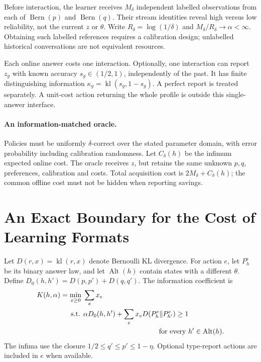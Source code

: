 \documentclass[sigconf,anonymous,review]{acmart}
\newcommand{\kl}{\operatorname{kl}}
\begin{document}
Before interaction, the learner receives $M_\delta$ independent labelled observations from each of $\operatorname{Bern}(p)$ and $\operatorname{Bern}(q)$. Their stream identities reveal high versus low reliability, not the current $z$ or $\theta$. Write $R_\delta=\log(1/\delta)$ and $M_\delta/R_\delta\to\alpha<\infty$. Obtaining such labelled references requires a calibration design; unlabelled historical conversations are not equivalent resources.

Each online answer costs one interaction. Optionally, one interaction can report $z_g$ with known accuracy $s_g\in(1/2,1)$, independently of the past. It has finite distinguishing information $\kappa_g=\kl(s_g,1-s_g)$. A perfect report is treated separately. A unit-cost action returning the whole profile is outside this single-answer interface.

\paragraph{An information-matched oracle.}
Policies must be uniformly $\delta$-correct over the stated parameter domain, with error probability including calibration randomness. Let $C_\delta(h)$ be the infimum expected online cost. The oracle receives $z$, but retains the same unknown $p,q$, preferences, calibration and costs. Total acquisition cost is $2M_\delta+C_\delta(h)$; the common offline cost must not be hidden when reporting savings.

\section{An Exact Boundary for the Cost of Learning Formats}
Let $D(r,x)=\kl(r,x)$ denote Bernoulli KL divergence. For action $e$, let $P_h^e$ be its binary answer law, and let $\operatorname{Alt}(h)$ contain states with a different $\theta$. Define $D_0(h,h')=D(p,p')+D(q,q')$. The information coefficient is
\begin{equation}\label{eq:program}
\begin{split}
 K(h,\alpha)=\min_{x\ge0}\;&\sum_e x_e\\
 \text{s.t. }&\alpha D_0(h,h')+\sum_e x_eD(P_h^e\Vert P_{h'}^e)\ge1\\
 &\hspace{38mm}\text{for every }h'\in\operatorname{Alt}(h).
\end{split}
\end{equation}
The infima use the closure $1/2\le q'\le p'\le1-\eta$. Optional type-report actions are included in $e$ when available.
\end{document}
